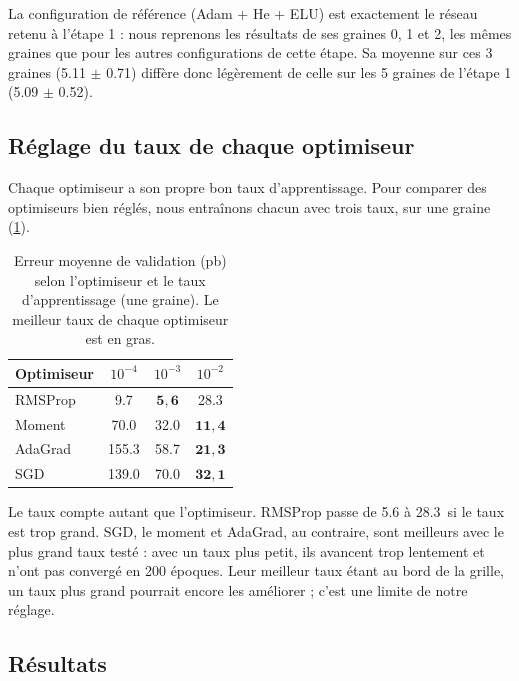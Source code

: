 La configuration de référence (Adam + He + ELU) est exactement le réseau retenu à l'étape 1 : nous reprenons les
résultats de ses graines 0, 1 et 2, les mêmes graines que pour les autres configurations de cette étape. Sa
moyenne sur ces 3 graines (\num{5.11} $\pm$ \num{0.71}\pb) diffère donc légèrement de celle sur les 5 graines de
l'étape 1 (\num{5.09} $\pm$ \num{0.52}\pb).

\subsection{Réglage du taux de chaque optimiseur}
\label{sec-entr-taux}

Chaque optimiseur a son propre bon taux d'apprentissage. Pour comparer des optimiseurs bien réglés, nous
entraînons chacun avec trois taux, sur une graine (\cref{tab-taux-optim}).

\begin{table}[H]
  \centering
  \caption{Erreur moyenne de validation (pb) selon l'optimiseur et le taux d'apprentissage (une graine).
  Le meilleur taux de chaque optimiseur est en gras.}
  \label{tab-taux-optim}
  \begin{tabular}{lccc}
    \toprule
    Optimiseur & $10^{-4}$ & $10^{-3}$ & $10^{-2}$ \\
    \midrule
    RMSProp & \num{9.7}   & $\mathbf{5{,}6}$ & \num{28.3} \\
    Moment  & \num{70.0}  & \num{32.0}  & $\mathbf{11{,}4}$ \\
    AdaGrad & \num{155.3} & \num{58.7}  & $\mathbf{21{,}3}$ \\
    SGD     & \num{139.0} & \num{70.0}  & $\mathbf{32{,}1}$ \\
    \bottomrule
  \end{tabular}
\end{table}

Le taux compte autant que l'optimiseur. RMSProp passe de \num{5.6} à \num{28.3}\pb\ si le taux est trop grand.
SGD, le moment et AdaGrad, au contraire, sont meilleurs avec le plus grand taux testé : avec un taux plus petit, ils
avancent trop lentement et n'ont pas convergé en 200 époques. Leur meilleur taux étant au bord de la grille, un taux
plus grand pourrait encore les améliorer ; c'est une limite de notre réglage.

\subsection{Résultats}
\label{sec-entr-resultats}

